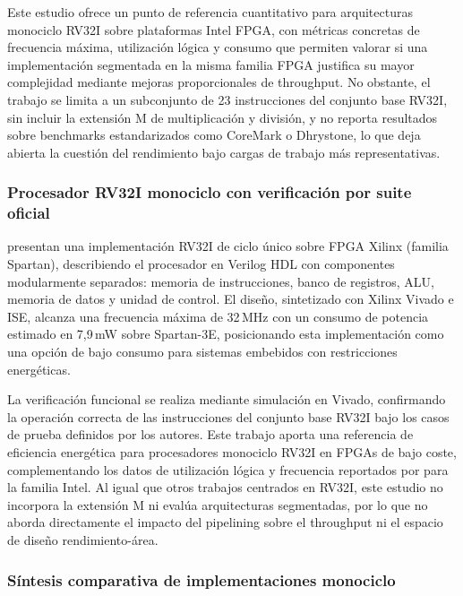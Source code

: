 Este estudio ofrece un punto de referencia cuantitativo para arquitecturas
monociclo RV32I sobre plataformas Intel FPGA, con métricas concretas de
frecuencia máxima, utilización lógica y consumo que permiten valorar si una
implementación segmentada en la misma familia FPGA justifica su mayor
complejidad mediante mejoras proporcionales de throughput.
No obstante, el trabajo se limita a un subconjunto de 23 instrucciones del
conjunto base RV32I, sin incluir la extensión M de multiplicación y división,
y no reporta resultados sobre benchmarks estandarizados como CoreMark o
Dhrystone, lo que deja abierta la cuestión del rendimiento bajo cargas de
trabajo más representativas.


\subsubsection{Procesador RV32I monociclo con verificación por suite oficial}

\textcite{Anjana2025Implementation} presentan una implementación RV32I de ciclo
único sobre FPGA Xilinx (familia Spartan), describiendo el procesador en Verilog
HDL con componentes modularmente separados: memoria de instrucciones, banco de
registros, ALU, memoria de datos y unidad de control.
El diseño, sintetizado con Xilinx Vivado e ISE, alcanza una frecuencia máxima de
32\,MHz con un consumo de potencia estimado en 7{,}9\,mW sobre Spartan-3E,
posicionando esta implementación como una opción de bajo consumo para sistemas
embebidos con restricciones energéticas.

La verificación funcional se realiza mediante simulación en Vivado, confirmando
la operación correcta de las instrucciones del conjunto base RV32I bajo los
casos de prueba definidos por los autores.
Este trabajo aporta una referencia de eficiencia energética para procesadores
monociclo RV32I en FPGAs de bajo coste, complementando los datos de utilización
lógica y frecuencia reportados por \textcite{Goh2024UTHMRISCV} para la
familia Intel.
Al igual que otros trabajos centrados en RV32I, este estudio no incorpora la
extensión M ni evalúa arquitecturas segmentadas, por lo que no aborda
directamente el impacto del pipelining sobre el throughput ni el espacio de
diseño rendimiento-área.



\subsubsection{Síntesis comparativa de implementaciones monociclo}

